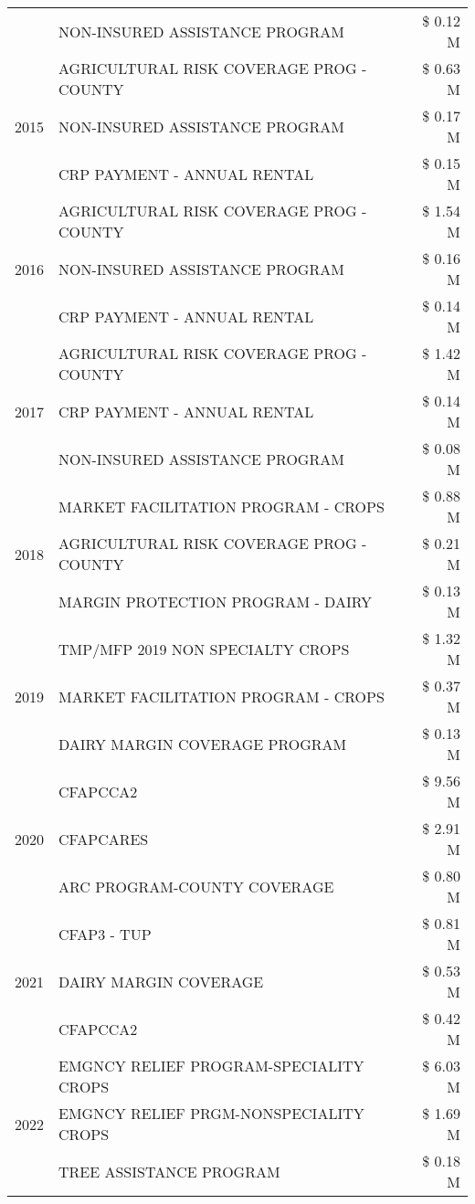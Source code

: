 \begin{tabular}{llr}
 & NON-INSURED ASSISTANCE PROGRAM & \$ 0.12 M \\
\cline{1-3}
\multirow[t]{3}{*}{2015} & AGRICULTURAL RISK COVERAGE PROG - COUNTY & \$ 0.63 M \\
 & NON-INSURED ASSISTANCE PROGRAM & \$ 0.17 M \\
 & CRP PAYMENT - ANNUAL RENTAL & \$ 0.15 M \\
\cline{1-3}
\multirow[t]{3}{*}{2016} & AGRICULTURAL RISK COVERAGE PROG - COUNTY & \$ 1.54 M \\
 & NON-INSURED ASSISTANCE PROGRAM & \$ 0.16 M \\
 & CRP PAYMENT - ANNUAL RENTAL & \$ 0.14 M \\
\cline{1-3}
\multirow[t]{3}{*}{2017} & AGRICULTURAL RISK COVERAGE PROG - COUNTY & \$ 1.42 M \\
 & CRP PAYMENT - ANNUAL RENTAL & \$ 0.14 M \\
 & NON-INSURED ASSISTANCE PROGRAM & \$ 0.08 M \\
\cline{1-3}
\multirow[t]{3}{*}{2018} & MARKET FACILITATION PROGRAM - CROPS & \$ 0.88 M \\
 & AGRICULTURAL RISK COVERAGE PROG - COUNTY & \$ 0.21 M \\
 & MARGIN PROTECTION PROGRAM - DAIRY & \$ 0.13 M \\
\cline{1-3}
\multirow[t]{3}{*}{2019} & TMP/MFP 2019 NON SPECIALTY CROPS & \$ 1.32 M \\
 & MARKET FACILITATION PROGRAM - CROPS & \$ 0.37 M \\
 & DAIRY MARGIN COVERAGE PROGRAM & \$ 0.13 M \\
\cline{1-3}
\multirow[t]{3}{*}{2020} & CFAPCCA2 & \$ 9.56 M \\
 & CFAPCARES & \$ 2.91 M \\
 & ARC PROGRAM-COUNTY COVERAGE & \$ 0.80 M \\
\cline{1-3}
\multirow[t]{3}{*}{2021} & CFAP3 - TUP & \$ 0.81 M \\
 & DAIRY MARGIN COVERAGE & \$ 0.53 M \\
 & CFAPCCA2 & \$ 0.42 M \\
\cline{1-3}
\multirow[t]{3}{*}{2022} & EMGNCY RELIEF PROGRAM-SPECIALITY CROPS & \$ 6.03 M \\
 & EMGNCY RELIEF PRGM-NONSPECIALITY CROPS & \$ 1.69 M \\
 & TREE ASSISTANCE PROGRAM & \$ 0.18 M \\
\cline{1-3}
\bottomrule
\end{tabular}
